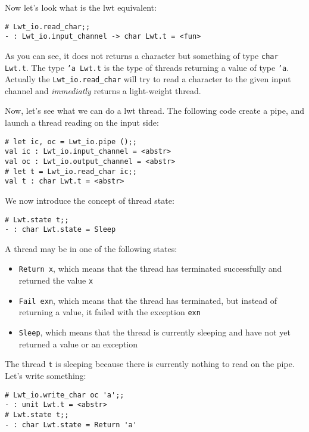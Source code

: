 \documentclass{article}
\begin{document}
Now let's look what is the lwt equivalent:

\begin{verbatim}
# Lwt_io.read_char;;
- : Lwt_io.input_channel -> char Lwt.t = <fun>
\end{verbatim}

As you can see, it does not returns a character but something of type
\texttt{char Lwt.t}. The type \texttt{'a Lwt.t} is the type of threads
returning a value of type \texttt{'a}. Actually the
\texttt{Lwt\_io.read\_char} will try to read a character to the given
input channel and \emph{immediatly} returns a light-weight thread.

Now, let's see what we can do a lwt thread. The following code create
a pipe, and launch a thread reading on the input side:

\begin{verbatim}
# let ic, oc = Lwt_io.pipe ();;
val ic : Lwt_io.input_channel = <abstr>
val oc : Lwt_io.output_channel = <abstr>
# let t = Lwt_io.read_char ic;;
val t : char Lwt.t = <abstr>
\end{verbatim}

We now introduce the concept of thread state:

\begin{verbatim}
# Lwt.state t;;
- : char Lwt.state = Sleep
\end{verbatim}

A thread may be in one of the following states:

\begin{itemize}
\item \texttt{Return x}, which means that the thread has terminated
  successfully and returned the value \texttt{x}
\item \texttt{Fail exn}, which means that the thread has terminated,
  but instead of returning a value, it failed with the exception
  \texttt{exn}
\item \texttt{Sleep}, which means that the thread is currently
  sleeping and have not yet returned a value or an exception
\end{itemize}

The thread \texttt{t} is sleeping because there is currently nothing
to read on the pipe. Let's write something:

\begin{verbatim}
# Lwt_io.write_char oc 'a';;
- : unit Lwt.t = <abstr>
# Lwt.state t;;
- : char Lwt.state = Return 'a'
\end{verbatim}
\end{document}
